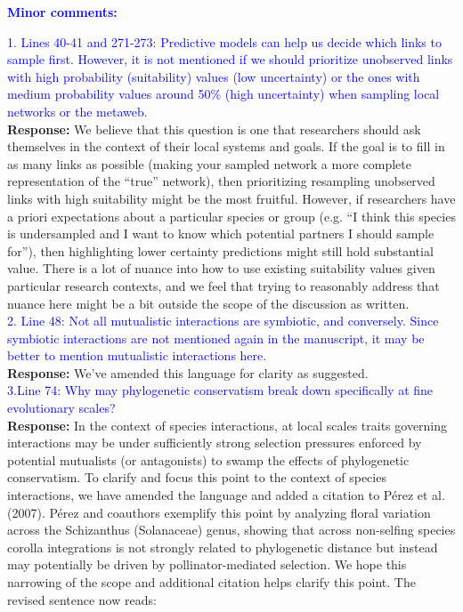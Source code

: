 \documentclass{article}
\begin{document}
\textcolor{blue}{\textbf{Minor comments:}}

\textcolor{blue}{1. Lines 40-41 and 271-273: Predictive models can help us decide which links to sample first. However, it is not mentioned if we should prioritize unobserved links with high probability (suitability) values (low uncertainty) or the ones with medium probability values around 50\% (high uncertainty) when sampling local networks or the metaweb.}
\\
\textbf{Response:} We believe that this question is one that researchers should ask themselves in the context of their local systems and goals. If the goal is to fill in as many links as possible (making your sampled network a more complete representation  of the “true” network), then prioritizing resampling unobserved links with high suitability might be the most fruitful. However, if researchers have a priori expectations about a particular species or group (e.g. “I think this species is undersampled and I want to know which potential partners I should sample for”), then highlighting lower certainty predictions might still hold substantial value. There is a lot of nuance into how to use existing suitability values given particular research contexts, and we feel that trying to reasonably address that nuance here might be a bit outside the scope of the discussion as written. \\

\textcolor{blue}{2. Line 48: Not all mutualistic interactions are symbiotic, and conversely. Since symbiotic interactions are not mentioned again in the manuscript, it may be better to mention mutualistic interactions here.} \\
\textbf{Response:} We’ve amended this language for clarity as suggested. \\

\textcolor{blue}{3.Line 74: Why may phylogenetic conservatism break down specifically at fine evolutionary scales?}\\
\textbf{Response:} In the context of species interactions, at local scales traits governing interactions may be under sufficiently strong selection pressures enforced by potential mutualists (or antagonists) to swamp the effects of phylogenetic conservatism. To clarify and focus this point to the context of species interactions, we have amended the language and added a citation to Pérez et al. (2007). Pérez and coauthors exemplify this point by analyzing floral variation across the Schizanthus (Solanaceae) genus, showing that across non-selfing species corolla integrations is not strongly related to phylogenetic distance but instead may potentially be driven by pollinator-mediated selection. We hope this narrowing of the scope and additional citation helps clarify this point. 
The revised sentence now reads: 
\end{document}

